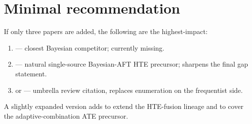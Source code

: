 \documentclass[11pt]{article}
\begin{document}
\section*{Minimal recommendation}

If only three papers are added, the following are the highest-impact:
\begin{enumerate}
  \item \textbf{\citet{yozova2025data}} --- closest Bayesian competitor; currently missing.
  \item \textbf{\citet{henderson2020individualized}} --- natural single-source Bayesian-AFT HTE precursor; sharpens the final gap statement.
  \item \textbf{\citet{colnet2024causal}} or \textbf{\citet{lintarpevans2024fusion}} --- umbrella review citation, replaces enumeration on the frequentist side.
\end{enumerate}
A slightly expanded version adds \citet{shyr2025multi} to extend the HTE-fusion lineage and \citet{chengcai2021adaptive} to cover the adaptive-combination ATE precursor.



\end{document}
